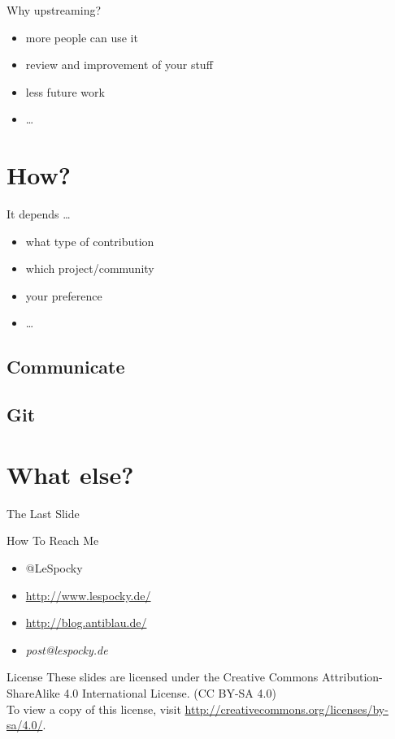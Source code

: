 \documentclass{beamer}
\begin{document}
\begin{frame}{Why upstreaming?}
    \begin{itemize}
        \item more people can use it
        \item review and improvement of your stuff
        \item less future work
        \item \dots
    \end{itemize}
\end{frame}

\section{How?}

\begin{frame}{It depends \dots}
    \begin{itemize}
        \item what type of contribution
        \item which project/community
        \item your preference
        \item \dots
    \end{itemize}
\end{frame}

\subsection{Communicate}

\subsection{Git}

\section*{What else?}

\begin{frame}{The Last Slide}
    \begin{block}{How To Reach Me}
        \begin{itemize}
            \item @LeSpocky
            \item \url{http://www.lespocky.de/}
            \item \url{http://blog.antiblau.de/}
            \item \emph{post@lespocky.de}
        \end{itemize}
    \end{block}
    \begin{block}{License}
        These slides are licensed under the Creative Commons
        Attribution-ShareAlike 4.0 International License. (CC BY-SA 4.0) \\
        To view a copy of this license, visit
        \url{http://creativecommons.org/licenses/by-sa/4.0/}.
    \end{block}
\end{frame}
\end{document}
